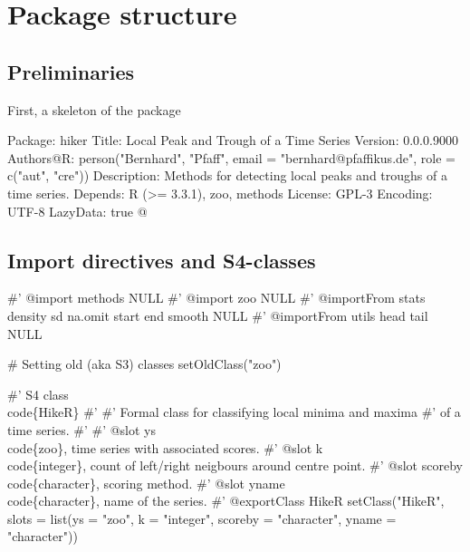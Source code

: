 \documentclass[a4paper]{article}
\begin{document}
\section{Package structure}


\subsection{Preliminaries}

First, a skeleton of the package

\nwenddocs{}\endmoddef\let\nwnotused=\nwoutput{}
Package: hiker
Title: Local Peak and Trough of a Time Series
Version: 0.0.0.9000
Authors@R: person("Bernhard", "Pfaff", email = "bernhard@pfaffikus.de",
                  role = c("aut", "cre"))
Description: Methods for detecting local peaks and troughs of a time series.
Depends: R (>= 3.3.1), zoo, methods
License: GPL-3
Encoding: UTF-8
LazyData: true
\nwnotused{DESCRIPTION.R}\nwendcode{}@



\subsection{Import directives and S4-classes}

\nwenddocs{}\endmoddef\let\nwnotused=\nwoutput{}
#' @import methods
NULL
#' @import zoo
NULL
#' @importFrom stats density sd na.omit start end smooth
NULL
#' @importFrom utils head tail
NULL

# Setting old (aka S3) classes
setOldClass("zoo")

#' S4 class \\code\{HikeR\}
#'
#' Formal class for classifying local minima and maxima
#' of a time series.
#'
#' @slot ys \\code\{zoo\}, time series with associated scores.
#' @slot k \\code\{integer\}, count of left/right neigbours around centre point.
#' @slot scoreby \\code\{character\}, scoring method.
#' @slot yname \\code\{character\}, name of the series.
#' @exportClass HikeR
setClass("HikeR", slots = list(ys = "zoo",
                               k = "integer",
                               scoreby = "character",
                               yname = "character"))
\end{document}

